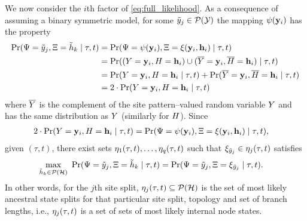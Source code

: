 We now consider the $i$th factor of \eqref{eq:full_likelihood}.
As a consequence of assuming a binary symmetric model, for some $\tilde{y}_j\in\mathcal{P}(\mathcal{Y})$ the mapping $\psi(\mathbf{y}_i)$ has the property
\begin{align*}
    \Pr(\Psi=\tilde{y}_j, \Xi=\tilde{h}_k \mid \tau, t) &= \Pr(\Psi=\psi(\mathbf{y}_i), \Xi=\xi(\mathbf{y}_i, \mathbf{h}_i) \mid \tau, t)\\
    &= \Pr((Y=\mathbf{y}_i, H=\mathbf{h}_i) \cup (\overline{Y}=\mathbf{y}_i, \overline{H}=\mathbf{h}_i) \mid \tau, t)\\
    &= \Pr(Y=\mathbf{y}_i, H=\mathbf{h}_i \mid \tau, t) + \Pr(\overline{Y}=\mathbf{y}_i, \overline{H}=\mathbf{h}_i \mid \tau, t)\\
    &= 2\cdot\Pr(Y=\mathbf{y}_i, H=\mathbf{h}_i \mid \tau, t)
\end{align*}
where $\overline{Y}$ is the complement of the site pattern--valued random variable $Y$ and has the same distribution as $Y$ (similarly for $H$).
Since
\begin{align*}
    2\cdot\Pr(Y=\mathbf{y}_i, H=\mathbf{h}_i \mid \tau, t) &= \Pr(\Psi=\psi(\mathbf{y}_i), \Xi=\xi(\mathbf{y}_i, \mathbf{h}_i) \mid \tau, t),
\end{align*}
given $(\tau, t)$, there exist sets $\eta_1(\tau, t),\ldots,\eta_q(\tau, t)$ such that $\xi_{\tilde{y}_j}\in\eta_j(\tau, t)$ satisfies
\begin{align*}
\max_{\ancestralSplit_k\in\mathcal{P}(\ancestralSplitSet)} \ \Pr(\siteSplitRV=\siteSplit_j, \ancestralSplitRV=\ancestralSplit_k \mid \tau, t) &= \Pr(\siteSplitRV=\siteSplit_j, \ancestralSplitRV = \xi_{\siteSplit_j} \mid \tau, t).
\end{align*}
In other words, for the $j$th site split, $\eta_j(\tau, t)\subseteq\mathcal{P}(\mathcal{H})$ is the set of most likely ancestral state splits for that particular site split, topology and set of branch lengths, i.e., $\eta_j(\tau, t)$ is a set of sets of most likely internal node states.
